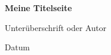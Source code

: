 \begin{titlepage}
	\thispagestyle{empty} %
	\centering
	\vspace*{1cm}
	{\LARGE \textbf{Meine Titelseite} \par}
	\vspace{1.5cm}
	{\Large Unterüberschrift oder Autor \par}
	\vfill
	{\large Datum \par}
	

\end{titlepage}
